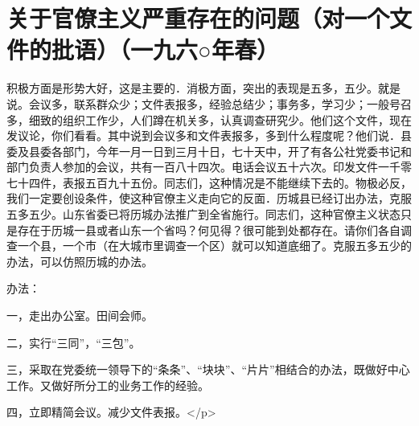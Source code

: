 \section[关于官僚主义严重存在的问题（对一个文件的批语）（一九六○年春）]{关于官僚主义严重存在的问题（对一个文件的批语）（一九六○年春）}


积极方面是形势大好，这是主要的．消极方面，突出的表现是五多，五少。就是说。会议多，联系群众少；文件表报多，经验总结少；事务多，学习少；一般号召多，细致的组织工作少，人们蹲在机关多，认真调查研究少。他们这个文件，现在发议论，你们看看。其中说到会议多和文件表报多，多到什么程度呢？他们说．县委及县委各部门，今年一月一日到三月十日，七十天中，开了有各公社党委书记和部门负责人参加的会议，共有一百八十四次。电话会议五十六次。印发文件一千零七十四件，表报五百九十五份。同志们，这种情况是不能继续下去的。物极必反，我们一定要创设条件，使这种官僚主义走向它的反面．历城县已经订出办法，克服五多五少。山东省委已将历城办法推广到全省施行。同志们，这种官僚主义状态只是存在于历城一县或者山东一个省吗？何见得？很可能到处都存在。请你们各自调查一个县，一个市（在大城市里调查一个区）就可以知道底细了。克服五多五少的办法，可以仿照历城的办法。

办法：

一，走出办公室。田间会师。

二，实行“三同”，“三包”。

三，采取在党委统一领导下的“条条”、“块块”、“片片”相结合的办法，既做好中心工作。又做好所分工的业务工作的经验。

四，立即精简会议。减少文件表报。</p>

